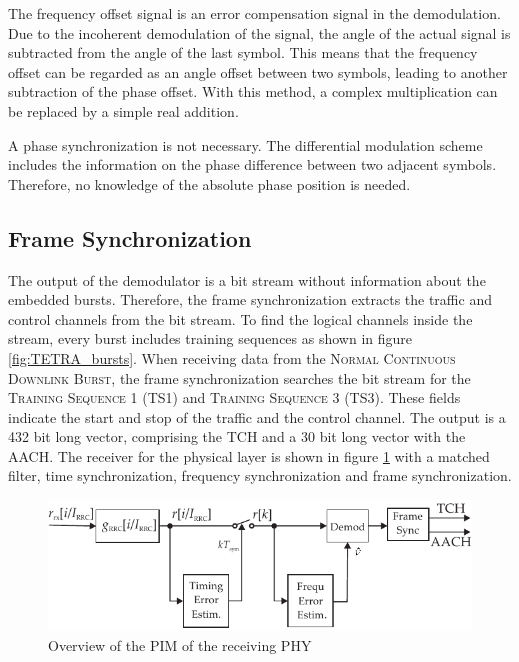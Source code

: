 The frequency offset signal is an error compensation signal in the demodulation. Due to the incoherent demodulation of the signal, the angle of the actual signal is subtracted from the angle of the last symbol. This means that the frequency offset can be regarded as an angle offset between two symbols, leading to another subtraction of the phase offset. With this method, a complex multiplication can be replaced by a simple real addition.

A phase synchronization is not necessary. The differential modulation scheme includes the information on the phase difference between two adjacent symbols. Therefore, no knowledge of the absolute phase position is needed.

\subsection{Frame Synchronization}
The output of the demodulator is a bit stream without information about the embedded bursts. Therefore, the frame synchronization extracts the traffic and control channels from the bit stream. To find the logical channels inside the stream, every burst includes training sequences as shown in figure \ref{fig:TETRA_bursts}. When receiving data from the \textsc{Normal Continuous Downlink Burst}, the frame synchronization searches the bit stream for the \textsc{Training Sequence 1} (TS1) and \textsc{Training Sequence 3} (TS3). These fields indicate the start and stop of the traffic and the control channel. The output is a 432 bit long vector, comprising the \ac{TCH} and a 30 bit long vector with the \ac{AACH}. The receiver for the physical layer is shown in figure \ref{fig:tetra_rx_pim} with a matched filter, time synchronization, frequency synchronization and frame synchronization.

\begin{figure}[htb]
	\centering
		\includegraphics{../kapitel04/figures/tetra_rx_pim.pdf}
	\caption{Overview of the \ac{PIM} of the receiving \ac{PHY}}
	\label{fig:tetra_rx_pim}
\end{figure}

